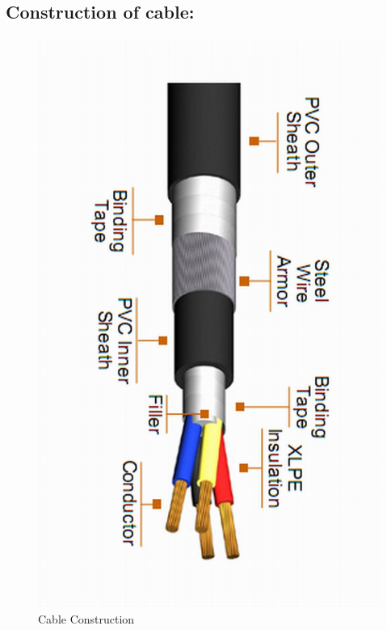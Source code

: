 \documentclass[12pt,fleqn]{book} %
\begin{document}
   \subsection{ Construction of cable:}
   \begin{figure}[h!]
    \centering
    \includegraphics[width=0.5\linewidth]{yousef 2.png}
    \caption{ Cable Construction}
    \label{fig:yousef 2}
\end{figure} 
\end{document}
